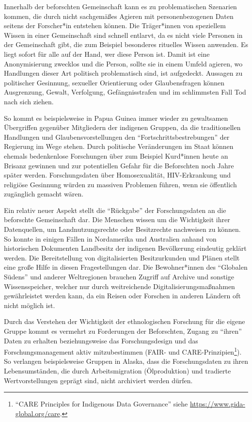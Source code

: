 \documentclass[a4paper,
fontsize=11pt,
oneside,
numbers=noperiodatend,
parskip=half-,
bibliography=totoc,
final
]{scrartcl}
\begin{document}
Innerhalb der beforschten Gemeinschaft kann es zu problematischen
Szenarien kommen, die durch nicht sachgemäßes Agieren mit
personenbezogenen Daten seitens der Forscher*in entstehen können. Die
Träger*innen von speziellem Wissen in einer Gemeinschaft sind schnell
entlarvt, da es nicht viele Personen in der Gemeinschaft gibt, die zum
Beispiel besonderes rituelles Wissen anwenden. Es liegt sofort für alle
auf der Hand, wer diese Person ist. Damit ist eine Anonymisierung
zwecklos und die Person, sollte sie in einem Umfeld agieren, wo
Handlungen dieser Art politisch problematisch sind, ist aufgedeckt.
Aussagen zu politischer Gesinnung, sexueller Orientierung oder
Glaubensfragen können Ausgrenzung, Gewalt, Verfolgung, Gefängnisstrafen
und im schlimmsten Fall Tod nach sich ziehen.

So kommt es beispielsweise in Papua Guinea immer wieder zu gewaltsamen
Übergriffen gegenüber Mitgliedern der indigenen Gruppen, da die
traditionellen Handlungen und Glaubensvorstellungen den
\enquote{Fortschrittsbestrebungen} der Regierung im Wege stehen. Durch
politische Veränderungen im Staat können ehemals bedenkenlose
Forschungen über zum Beispiel Kurd*innen heute an Brisanz gewinnen und
zur potentiellen Gefahr für die Beforschten noch Jahre später werden.
Forschungsdaten über Homosexualität, HIV-Erkrankung und religiöse
Gesinnung würden zu massiven Problemen führen, wenn sie öffentlich
zugänglich gemacht wären.

Ein relativ neuer Aspekt stellt die \enquote{Rückgabe} der
Forschungsdaten an die beforschte Gemeinschaft dar. Die Menschen wissen
um die Wichtigkeit ihrer Datenquellen, um Landnutzungsrechte oder
Besitzrechte nachweisen zu können. So konnte in einigen Fällen in
Nordamerika und Australien anhand von historischen Dokumenten Landbesitz
der indigenen Bevölkerung eindeutig geklärt werden. Die Bereitstellung
von digitalisierten Besitzurkunden und Plänen stellt eine große Hilfe in
diesen Fragestellungen dar. Die Bewohner*innen des \enquote{Globalen
Südens} und anderer Weltregionen brauchen Zugriff auf Archive und
sonstige Wissensspeicher, welcher nur durch weitreichende
Digitalisierungsmaßnahmen gewährleistet werden kann, da ein Reisen oder
Forschen in anderen Ländern oft nicht möglich ist.

Durch das Verstehen der Wichtigkeit der ethnologischen Forschung für die
eigene Gruppe kom\-mt es vermehrt zu Forderungen der Beforschten, Zugang
zu \enquote{ihren} Daten zu erhalten beziehungsweise das
Forschungsdesign und das Forschungsmanagement aktiv mitzubestimmen
(FAIR- und CARE-Prinzipien\footnote{\enquote{CARE Principles for
  Indigenous Data Governance} siehe
  \url{https://www.gida-global.org/care}.}). So verlangen beispielsweise
Gruppen in Alaska, dass die Forschungsdaten zu ihren Lebensumständen,
die durch Arbeitsmigration (Ölproduktion) und tradierte
Wertvorstellungen geprägt sind, nicht archiviert werden dürfen.
\end{document}
